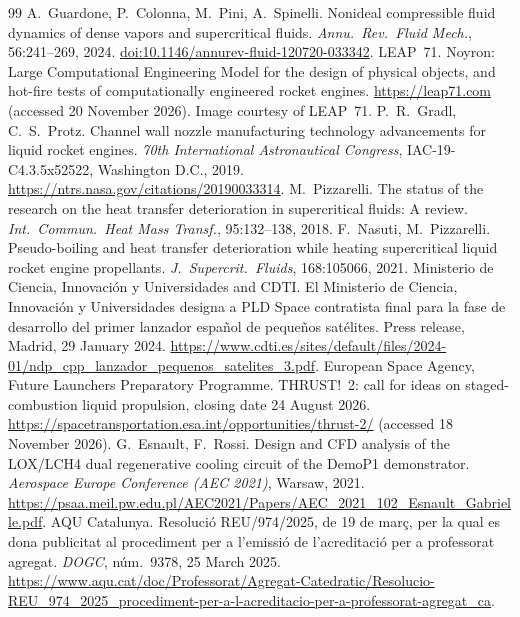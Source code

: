 \documentclass[11pt]{article}
\begin{document}
\begin{thebibliography}{99}\small
{}
A.\ Guardone, P.\ Colonna, M.\ Pini, A.\ Spinelli.
Nonideal compressible fluid dynamics of dense vapors and supercritical fluids.
\emph{Annu.\ Rev.\ Fluid Mech.}, 56:241--269, 2024.
\href{https://doi.org/10.1146/annurev-fluid-120720-033342}{doi:10.1146/annurev-fluid-120720-033342}.
 LEAP~71. Noyron: Large Computational Engineering Model for the design of physical objects, and hot-fire tests of computationally engineered rocket engines. \url{https://leap71.com} (accessed 20 November 2026). Image courtesy of LEAP~71.
 P.\ R.\ Gradl, C.\ S.\ Protz. Channel wall nozzle manufacturing technology advancements for liquid rocket engines. \emph{70th International Astronautical Congress}, IAC-19-C4.3.5x52522, Washington D.C., 2019. \url{https://ntrs.nasa.gov/citations/20190033314}.
 M.\ Pizzarelli. The status of the research on the heat transfer deterioration in supercritical fluids: A review. \emph{Int.\ Commun.\ Heat Mass Transf.}, 95:132--138, 2018.
 F.\ Nasuti, M.\ Pizzarelli. Pseudo-boiling and heat transfer deterioration while heating supercritical liquid rocket engine propellants. \emph{J.\ Supercrit.\ Fluids}, 168:105066, 2021.
 Ministerio de Ciencia, Innovaci\'on y Universidades and CDTI. El Ministerio de Ciencia, Innovaci\'on y Universidades designa a PLD Space contratista final para la fase de desarrollo del primer lanzador espa\~nol de peque\~nos sat\'elites. Press release, Madrid, 29 January 2024. \url{https://www.cdti.es/sites/default/files/2024-01/ndp_cpp_lanzador_pequenos_satelites_3.pdf}.
 European Space Agency, Future Launchers Preparatory Programme. THRUST!~2: call for ideas on staged-combustion liquid propulsion, closing date 24 August 2026. \url{https://spacetransportation.esa.int/opportunities/thrust-2/} (accessed 18 November 2026).
 G.\ Esnault, F.\ Rossi. Design and CFD analysis of the LOX/LCH4 dual regenerative cooling circuit of the DemoP1 demonstrator. \emph{Aerospace Europe Conference (AEC 2021)}, Warsaw, 2021. \url{https://psaa.meil.pw.edu.pl/AEC2021/Papers/AEC_2021_102_Esnault_Gabrielle.pdf}.
 AQU Catalunya. Resoluci\'o REU/974/2025, de 19 de mar\c{c}, per la qual es dona publicitat al procediment per a l'emissi\'o de l'acreditaci\'o per a professorat agregat. \emph{DOGC}, n\'um.~9378, 25 March 2025. \url{https://www.aqu.cat/doc/Professorat/Agregat-Catedratic/Resolucio-REU_974_2025_procediment-per-a-l-acreditacio-per-a-professorat-agregat_ca}.

\end{thebibliography}
\end{document}
